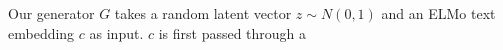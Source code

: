 Our generator $G$ takes a random latent vector $z \sim N(0, 1)$ and an ELMo text embedding $c$ as input. $c$ is first passed through a